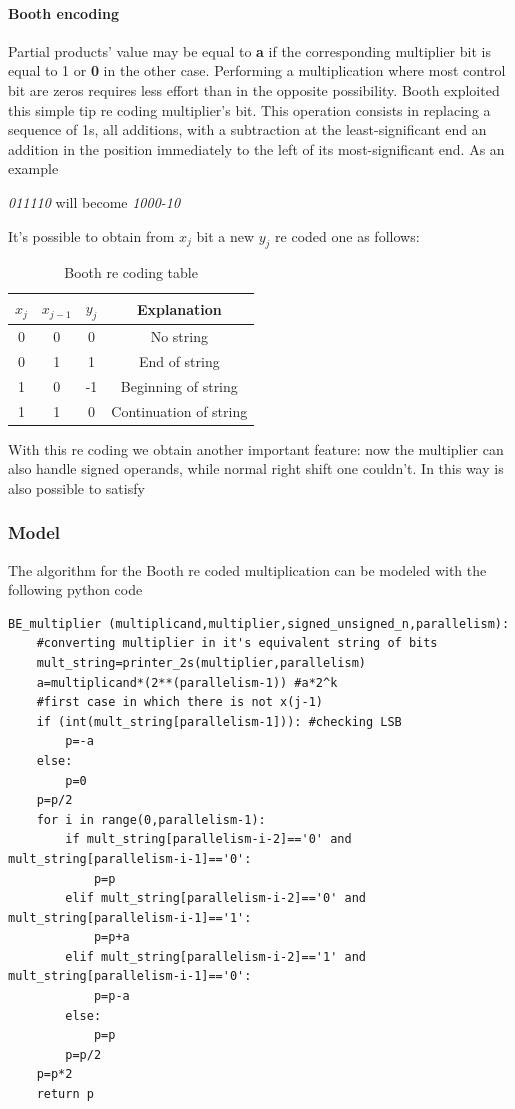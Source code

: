 \paragraph{Booth encoding}
Partial products' value may be equal to \textbf{a} if the corresponding multiplier bit is equal to 1 or \textbf{0} in the other case. Performing a multiplication where most control bit are zeros requires less effort than in the opposite possibility. Booth exploited this simple tip re coding multiplier's bit. This operation consists in replacing a sequence of 1s, all additions, with a subtraction at the least-significant end an addition in the position immediately to the left of its most-significant end. As an example
\begin{center}
    \textit{011110} will become \textit{1000-10}
\end{center}
It's possible to obtain from \textit{$x_j$} bit a new \textit{$y_j$} re coded one as follows:
\begin{table}[H]
    \centering
    \begin{tabular}{c|c|c|c}
        $x_j$   & $x_{j-1}$ & $y_j$ & Explanation   \\
        \hline
        0       &   0        &  0     & No string\\   
        0        &      1     &  1      & End of string              \\
        1        &       0    &   -1    &       Beginning of string  \\
        1        &       1    & 0      &  Continuation of string             \\
    \end{tabular}
    \caption{Booth re coding table}
    \label{tab:my_label}
\end{table}
With this re coding we obtain another important feature: now the multiplier can also handle signed operands, while normal right shift one couldn't. In this way is also possible to satisfy 

\subsubsection{Model}
The algorithm for the Booth re coded multiplication can be modeled with the following python code
\begin{verbatim}
BE_multiplier (multiplicand,multiplier,signed_unsigned_n,parallelism):
    #converting multiplier in it's equivalent string of bits
    mult_string=printer_2s(multiplier,parallelism)
    a=multiplicand*(2**(parallelism-1)) #a*2^k
    #first case in which there is not x(j-1)
    if (int(mult_string[parallelism-1])): #checking LSB
        p=-a
    else:
        p=0
    p=p/2
    for i in range(0,parallelism-1):
        if mult_string[parallelism-i-2]=='0' and mult_string[parallelism-i-1]=='0':
            p=p
        elif mult_string[parallelism-i-2]=='0' and mult_string[parallelism-i-1]=='1':
            p=p+a
        elif mult_string[parallelism-i-2]=='1' and mult_string[parallelism-i-1]=='0':
            p=p-a
        else:
            p=p
        p=p/2
    p=p*2
    return p
\end{verbatim}
